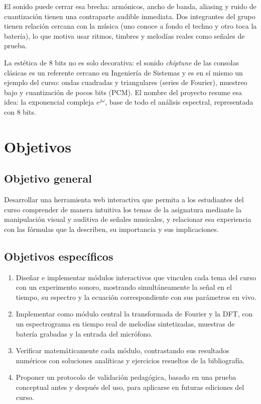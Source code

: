 \documentclass[conference]{IEEEtran}
\begin{document}
El sonido puede cerrar esa brecha: armónicos, ancho de banda, aliasing y ruido de cuantización tienen una contraparte audible inmediata. Dos integrantes del grupo tienen relación cercana con la música (uno conoce a fondo el techno y otro toca la batería), lo que motiva usar ritmos, timbres y melodías reales como señales de prueba.

La estética de 8 bits no es solo decorativa: el sonido \emph{chiptune} de las consolas clásicas es un referente cercano en Ingeniería de Sistemas \citep{collins2008} y es en sí mismo un ejemplo del curso: ondas cuadradas y triangulares (series de Fourier), muestreo bajo y cuantización de pocos bits (PCM). El nombre del proyecto resume esa idea: la exponencial compleja $e^{j\omega}$, base de todo el análisis espectral, representada con 8 bits.

\section{Objetivos}
\subsection{Objetivo general}
Desarrollar una herramienta web interactiva que permita a los estudiantes del curso comprender de manera intuitiva los temas de la asignatura mediante la manipulación visual y auditiva de señales musicales, y relacionar esa experiencia con las fórmulas que la describen, su importancia y sus implicaciones.

\subsection{Objetivos específicos}
\begin{enumerate}
\item Diseñar e implementar módulos interactivos que vinculen cada tema del curso con un experimento sonoro, mostrando simultáneamente la señal en el tiempo, su espectro y la ecuación correspondiente con sus parámetros en vivo.
\item Implementar como módulo central la transformada de Fourier y la DFT, con un espectrograma en tiempo real de melodías sintetizadas, muestras de batería grabadas y la entrada del micrófono.
\item Verificar matemáticamente cada módulo, contrastando sus resultados numéricos con soluciones analíticas y ejercicios resueltos de la bibliografía.
\item Proponer un protocolo de validación pedagógica, basado en una prueba conceptual antes y después del uso, para aplicarse en futuras ediciones del curso.
\end{enumerate}
\end{document}

